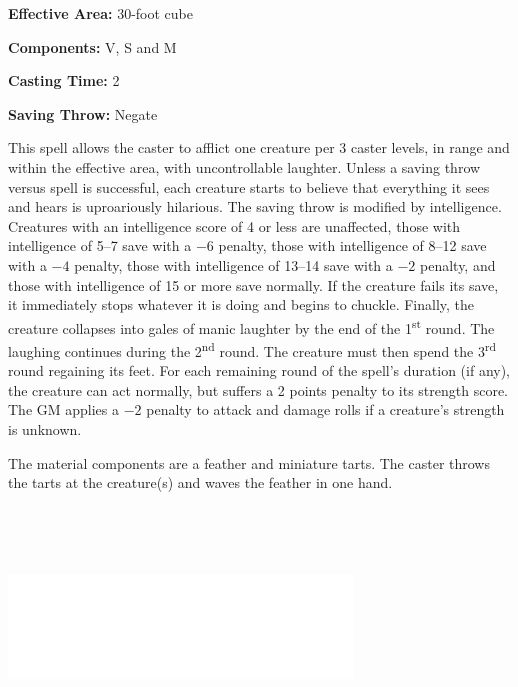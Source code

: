\begin{multicols}{2}
\begin{minipage}{\columnwidth}
\noindent \textbf{Effective Area:} 30-foot cube

\noindent \textbf{Components:} V, S and M

\noindent \textbf{Casting Time:} 2

\noindent \textbf{Saving Throw:} Negate

\end{minipage}

This spell allows the caster to afflict one creature per 3 caster levels, in range and within the effective area, with uncontrollable laughter.  Unless a saving throw versus spell is successful, each creature starts to believe that everything it sees and hears is uproariously hilarious.  The saving throw is modified by intelligence.  Creatures with an intelligence score of 4 or less are unaffected, those with intelligence of 5--7 save with a $-6$ penalty, those with intelligence of 8--12 save with a $-4$ penalty, those with intelligence of 13--14 save with a $-2$ penalty, and those with intelligence of 15 or more save normally.  If the creature fails its save, it immediately stops whatever it is doing and begins to chuckle.  Finally, the creature collapses into gales of manic laughter by the end of the 1\textsuperscript{st} round.  The laughing continues during the 2\textsuperscript{nd} round.  The creature must then spend the 3\textsuperscript{rd} round regaining its feet.  For each remaining round of the spell's duration (if any), the creature can act normally, but suffers a 2 points penalty to its strength score.  The GM applies a $-2$ penalty to attack and damage rolls if a creature's strength is unknown.

The material components are a feather and miniature tarts.  The caster throws the tarts at the creature(s) and waves the feather in one hand.

\noindent\includegraphics[width=3.6in, height=2.5in]{testblock.pdf}


\end{multicols}
